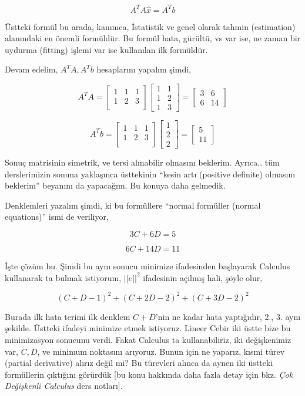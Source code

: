\documentclass[12pt,fleqn]{article}\usepackage{../../common}
\begin{document}
$$ A^T A\hat{x} = A^Tb $$

Üstteki formül bu arada, kanımca, İstatistik ve genel olarak tahmin
(estimation) alanındaki en önemli formüldür. Bu formül hata, gürültü, vs
var ise, ne zaman bir uydurma (fitting) işlemi var ise kullanılan ilk
formüldür.

Devam edelim, $A^TA,A^Tb$ hesaplarını yapalım şimdi,

$$ 
A^TA = 
\left[\begin{array}{rrr}
1 & 1 & 1\\
1 & 2 & 3\\
\end{array}\right]
\left[\begin{array}{rr}
1 & 1 \\
1 & 2 \\
1 & 3
\end{array}\right] =
\left[\begin{array}{rr}
3 & 6 \\
6 & 14
\end{array}\right] 
 $$

$$ A^Tb = 
\left[\begin{array}{rrr}
1 & 1 & 1\\
1 & 2 & 3\\
\end{array}\right]
\left[\begin{array}{r}
1 \\
2 \\
2
\end{array}\right] =
\left[\begin{array}{r}
5 \\
11 
\end{array}\right]
 $$

Sonuç matrisinin simetrik, ve tersi alınabilir olmasını beklerim. Ayrıca.. tüm
derslerimizin sonuna yaklaşınca üsttekinin ``kesin artı (positive definite)
olmasını beklerim'' beyanını da yapacağım. Bu konuya daha gelmedik.

Denklemleri yazalım şimdi, ki bu formüllere ``normal formüller (normal
equations)'' ismi de veriliyor,

$$ 3C + 6D = 5 $$

$$ 6C + 14D = 11 $$

İşte çözüm bu. Şimdi bu aynı sonucu minimize ifadesinden başlayarak
Calculus kullanarak ta bulmak istiyorum, $||e||^2$ ifadesinin açılmış hali,
şöyle olur, 

$$ (C+D-1)^2 + (C+2D-2)^2 + (C+3D-2)^2 $$

Burada ilk hata terimi ilk denklem $C+D$'nin ne kadar hata yaptığıdır, 2.,
3. aynı şekilde. Üstteki ifadeyi minimize etmek istiyoruz. Lineer Cebir iki
üstte bize bu minimizasyon sonucunu verdi. Fakat Calculus ta
kullanabiliriz, iki değişkenimiz var, $C,D$, ve minimum noktasını arıyoruz.
Bunun için ne yaparız, kısmi türev (partial derivative) alırız değil mi? Bu
türevleri alınca da aynen iki üstteki formüllerin çıktığını görürdük [bu
konu hakkında daha fazla detay için bkz. {\em Çok Değişkenli Calculus} ders
notları].
\end{document}
